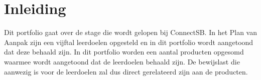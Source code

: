 \setcounter{page}{1}

\section{Inleiding}
Dit portfolio gaat over de stage die wordt gelopen bij ConnectSB. In het Plan van Aanpak zijn een vijftal leerdoelen opgesteld en in dit portfolio wordt aangetoond dat deze behaald zijn.
\newline
In dit portfolio worden een aantal producten opgesomd waarmee wordt aangetoond dat de leerdoelen behaald zijn. De bewijslast die aanwezig is voor de leerdoelen zal dus direct gerelateerd zijn aan de producten.

\clearpage